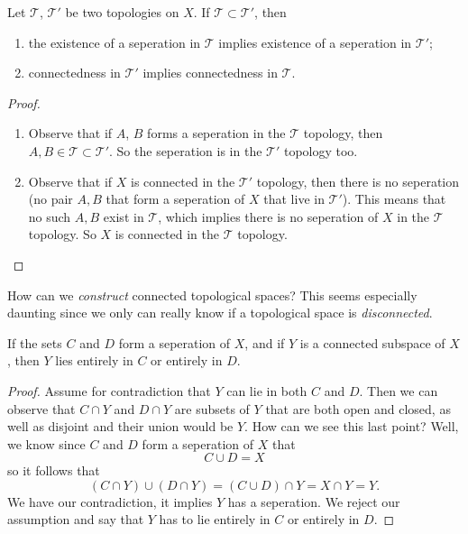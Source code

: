 \begin{prop}%
Let $\mathcal{T}$, $\mathcal{T}'$ be two topologies on $X$. If
$\mathcal{T}\subset\mathcal{T}'$, then
\begin{enumerate}
\item the existence of a seperation
in $\mathcal{T}$ implies existence of a seperation in
$\mathcal{T}'$;
\item connectedness in $\mathcal{T}'$ implies connectedness in
  $\mathcal{T}$.
\end{enumerate}
\end{prop}
\begin{proof}
\noindent\begin{enumerate}
\item Observe that if $A$, $B$ forms a seperation in the
  $\mathcal{T}$ topology, then
  $A,B\in\mathcal{T}\subset\mathcal{T}'$. So the seperation is in
  the $\mathcal{T}'$ topology too.
\item Observe that if $X$ is connected in the $\mathcal{T}'$
  topology, then there is no seperation (no pair $A,B$ that form
  a seperation of $X$ that live in $\mathcal{T}'$). This means
  that no such $A,B$ exist in $\mathcal{T}$, which implies there
  is no seperation of $X$ in the $\mathcal{T}$ topology. So $X$
  is connected in the $\mathcal{T}$ topology.
\end{enumerate}
\end{proof}
\begin{prob}
How can we \emph{construct} connected topological spaces? This
seems especially daunting since we only can really know if a
topological space is \emph{disconnected}.
\end{prob}
\begin{thm}%
If the sets $C$ and $D$ form a seperation of $X$, and if $Y$ is a
connected subspace of $X$, then $Y$ lies entirely in $C$ or
entirely in $D$.
\end{thm}
\begin{proof}
Assume for contradiction that $Y$ can lie in both $C$ and
$D$. Then we can observe that $C\cap Y$ and $D\cap Y$ are subsets
of $Y$ that are both open and closed, as well as disjoint and
their union would be $Y$. How can we see this last point? Well,
we know since $C$ and $D$ form a seperation of $X$ that
\begin{equation}%
C\cup D=X
\end{equation}
so it follows that
\begin{equation}%
(C\cap Y)\cup(D\cap Y) = (C\cup D)\cap Y = X\cap Y = Y.
\end{equation}
We have our contradiction, it implies $Y$ has a seperation. We
reject our assumption and say that $Y$ has to lie entirely in $C$
or entirely in $D$.
\end{proof}
